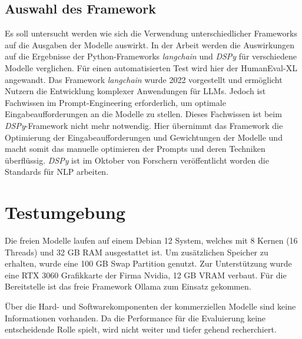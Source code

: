 \subsection{Auswahl des Framework}
Es soll untersucht werden wie sich die Verwendung unterschiedlicher Frameworks auf die Ausgaben der Modelle auswirkt. In der Arbeit werden die Auswirkungen auf die Ergebnisse der Python-Frameworks \textit{langchain} und \textit{DSPy} für verschiedene Modelle verglichen. Für einen automatisierten Test wird hier der HumanEval-XL angewandt. Das Framework \textit{langchain} wurde 2022 vorgestellt und ermöglicht Nutzern die Entwicklung komplexer Anwendungen für LLMs. Jedoch ist Fachwissen im Prompt-Engineering erforderlich, um optimale Eingabeaufforderungen an die Modelle zu stellen. Dieses Fachwissen ist beim \textit{DSPy}-Framework nicht mehr notwendig. Hier übernimmt das Framework die Optimierung der Eingabeaufforderungen und Gewichtungen der Modelle und macht somit das manuelle optimieren der Prompts und deren Techniken überflüssig. \textit{DSPy} ist im Oktober von Forschern veröffentlicht worden die Standards für NLP arbeiten.\vspace{0.2cm}






\section{Testumgebung}
Die freien Modelle laufen auf einem Debian 12 System, welches mit 8 Kernen (16 Threads) und 32 GB RAM ausgestattet ist. Um zusätzlichen Speicher zu erhalten, wurde eine 100 GB Swap Partition genutzt. Zur Unterstützung wurde eine RTX 3060 Grafikkarte der Firma Nvidia, 12 GB VRAM verbaut. Für die Bereitstelle ist das freie Framework Ollama zum Einsatz gekommen.\vspace{0.2cm}

Über die Hard- und Softwarekomponenten der kommerziellen Modelle sind keine Informationen vorhanden. Da die Performance für die Evaluierung keine entscheidende Rolle spielt, wird nicht weiter und tiefer gehend recherchiert. \vspace{0.2cm}

